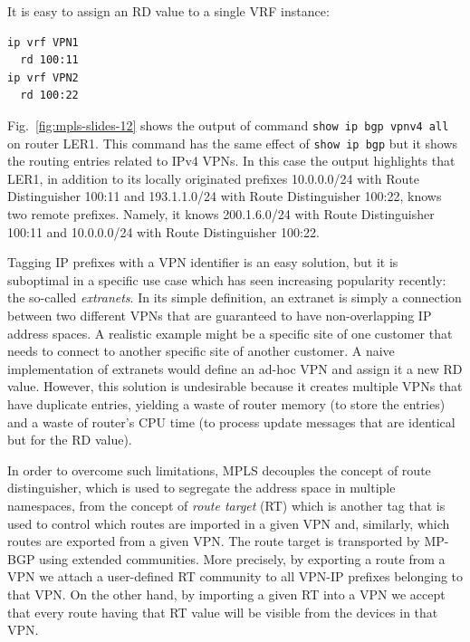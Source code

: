 \documentclass{article}
\newenvironment{codice}
{
\noindent
\begin{minipage}[b]{\columnwidth}
\definecolor{shadecolor}{rgb}{1,1,1}
\begin{framed}}
{
\vspace{-0.4cm}
\end{framed}
\end{minipage}
\definecolor{shadecolor}{rgb}{1,1,0.7}
}
\begin{document}
\begin{shaded}
\noindent
It is easy to assign an RD value to a single VRF instance:\\

\begin{codice}
\begin{verbatim}
ip vrf VPN1
  rd 100:11
ip vrf VPN2
  rd 100:22
\end{verbatim}
\end{codice}

Fig.~\ref{fig:mpls-slides-12} shows the output of command {\tt show ip bgp vpnv4 
all} on router LER1. This command has the same effect of {\tt show ip bgp} but 
it shows the routing entries related to IPv4 VPNs. In this case the output 
highlights that LER1, in addition to its locally originated prefixes 10.0.0.0/24 
with Route Distinguisher 100:11 and 193.1.1.0/24 with Route Distinguisher 
100:22, knows two remote prefixes. Namely, it knows 200.1.6.0/24 with Route 
Distinguisher 100:11 and 10.0.0.0/24 with Route Distinguisher 100:22.
\end{shaded}

Tagging IP prefixes with a VPN identifier is an easy solution, but it is 
suboptimal in a specific use case which has seen increasing popularity 
recently: the so-called \emph{extranets}. In its simple definition, an extranet 
is simply a connection between two different VPNs that are guaranteed to have 
non-overlapping IP address spaces. A realistic example might be a specific 
site of one customer that needs to connect to another specific site of 
another customer. A naive implementation of extranets would define an ad-hoc 
VPN and assign it a new RD value. However, this solution is undesirable because 
it creates multiple VPNs that have duplicate entries, yielding a waste of 
router memory (to store the entries) and a waste of router's CPU time (to 
process update messages that are identical but for the RD value).

In order to overcome such limitations, MPLS decouples the concept of route 
distinguisher, which is used to segregate the address space in multiple 
namespaces, from the concept of \emph{route target} (RT) which is another tag 
that is used to control which routes are imported in a given VPN and, 
similarly, which routes are exported from a given VPN. The route target is 
transported by MP-BGP using extended communities. More precisely, by 
exporting a route from a VPN we attach a user-defined RT community to all 
VPN-IP prefixes belonging to that VPN. On the other hand, by importing a 
given RT into a VPN we accept that every route having that RT value will 
be visible from the devices in that VPN.
\end{document}
